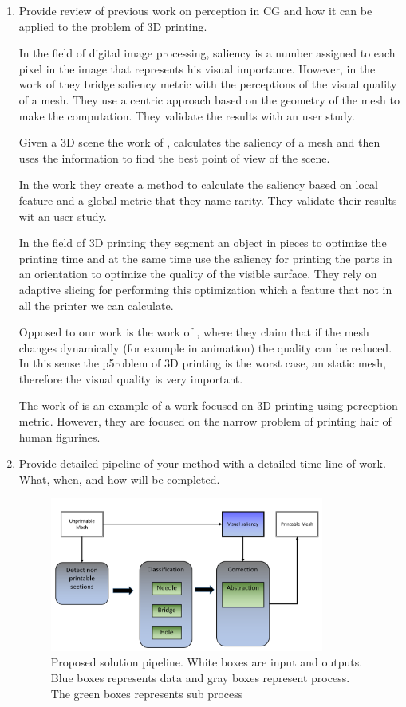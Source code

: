 \begin{enumerate}
  \item Provide review of previous work on perception in CG and how it can be applied to the problem of 3D printing.
	
	In the field of digital image processing, saliency is a number assigned to each pixel in the image that represents his visual importance. However, in the work of \cite{Kim2010} they bridge saliency metric with the perceptions of the visual quality of a mesh. They use a centric approach based on the geometry of the mesh to make the computation. They validate the results with an user study.
	
	Given a 3D scene the work of \cite{Feixas2009}, calculates the saliency of a mesh and then uses the information to find the best point of view of the scene. 
	
	In the work \cite{Wu2013} they create a method to calculate the saliency based on local feature and a global metric that they name rarity. They validate their results wit an user study.
	
	In the field of 3D printing \cite{Wang2015} they segment an object in pieces to optimize the printing time and at the same time use the saliency for printing the parts in an orientation to optimize the quality of the visible surface. They rely on adaptive slicing for performing this optimization which a feature that not in all the printer we can calculate.
	
	Opposed to our work is the work of \cite{Torkhani2015}, where they claim that if the mesh changes dynamically (for example in animation) the quality can be reduced. In this sense the p5roblem of 3D printing is the worst case, an static mesh, therefore the visual quality is very important.
	
	The work of \cite{Echevarria2014} is an example of a work focused on 3D printing using perception metric. However, they are focused on the narrow problem of printing hair of human figurines.
	
  \item Provide detailed pipeline of your method with a detailed time line of work. What, when, and how will be completed.
	
	\begin{figure}[htp]
		\centering
    \includegraphics[width=0.85\textwidth]{img/Pipeline2}
		\caption{Proposed solution pipeline. White boxes are input and outputs. Blue boxes represents data and gray boxes represent process. The green boxes represents sub process}
		\label{fig:pipeline}
	\end{figure}
	

\end{enumerate}
